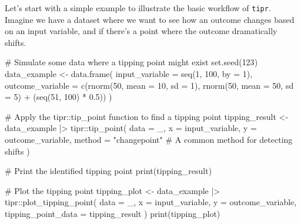\documentclass[
  10pt,
  letterpaper,
  DIV=11,
  numbers=noendperiod]{scrartcl}
\newenvironment{Shaded}{\begin{snugshade}}{\end{snugshade}}
\newcommand{\AttributeTok}[1]{\textcolor[rgb]{0.40,0.45,0.13}{#1}}
\newcommand{\CommentTok}[1]{\textcolor[rgb]{0.37,0.37,0.37}{#1}}
\newcommand{\DecValTok}[1]{\textcolor[rgb]{0.68,0.00,0.00}{#1}}
\newcommand{\FloatTok}[1]{\textcolor[rgb]{0.68,0.00,0.00}{#1}}
\newcommand{\FunctionTok}[1]{\textcolor[rgb]{0.28,0.35,0.67}{#1}}
\newcommand{\NormalTok}[1]{\textcolor[rgb]{0.00,0.23,0.31}{#1}}
\newcommand{\OtherTok}[1]{\textcolor[rgb]{0.00,0.23,0.31}{#1}}
\newcommand{\SpecialCharTok}[1]{\textcolor[rgb]{0.37,0.37,0.37}{#1}}
\newcommand{\StringTok}[1]{\textcolor[rgb]{0.13,0.47,0.30}{#1}}
\begin{document}
Let's start with a simple example to illustrate the basic workflow of
\texttt{tipr}. Imagine we have a dataset where we want to see how an
outcome changes based on an input variable, and if there's a point where
the outcome dramatically shifts.

\begin{Shaded}
\begin{Highlighting}[]
\CommentTok{\# Simulate some data where a tipping point might exist}
\FunctionTok{set.seed}\NormalTok{(}\DecValTok{123}\NormalTok{)}
\NormalTok{data\_example }\OtherTok{\textless{}{-}} \FunctionTok{data.frame}\NormalTok{(}
  \AttributeTok{input\_variable =} \FunctionTok{seq}\NormalTok{(}\DecValTok{1}\NormalTok{, }\DecValTok{100}\NormalTok{, }\AttributeTok{by =} \DecValTok{1}\NormalTok{),}
  \AttributeTok{outcome\_variable =} \FunctionTok{c}\NormalTok{(}\FunctionTok{rnorm}\NormalTok{(}\DecValTok{50}\NormalTok{, }\AttributeTok{mean =} \DecValTok{10}\NormalTok{, }\AttributeTok{sd =} \DecValTok{1}\NormalTok{), }\FunctionTok{rnorm}\NormalTok{(}\DecValTok{50}\NormalTok{, }\AttributeTok{mean =} \DecValTok{50}\NormalTok{, }\AttributeTok{sd =} \DecValTok{5}\NormalTok{) }\SpecialCharTok{+}\NormalTok{ (}\FunctionTok{seq}\NormalTok{(}\DecValTok{51}\NormalTok{, }\DecValTok{100}\NormalTok{) }\SpecialCharTok{*} \FloatTok{0.5}\NormalTok{))}
\NormalTok{)}

\CommentTok{\# Apply the tipr::tip\_point function to find a tipping point}
\NormalTok{tipping\_result }\OtherTok{\textless{}{-}}\NormalTok{ data\_example }\SpecialCharTok{|\textgreater{}}
\NormalTok{  tipr}\SpecialCharTok{::}\FunctionTok{tip\_point}\NormalTok{(}
    \AttributeTok{data =}\NormalTok{ \_,}
    \AttributeTok{x =}\NormalTok{ input\_variable,}
    \AttributeTok{y =}\NormalTok{ outcome\_variable,}
    \AttributeTok{method =} \StringTok{"changepoint"} \CommentTok{\# A common method for detecting shifts}
\NormalTok{  )}

\CommentTok{\# Print the identified tipping point}
\FunctionTok{print}\NormalTok{(tipping\_result)}

\CommentTok{\# Plot the tipping point}
\NormalTok{tipping\_plot }\OtherTok{\textless{}{-}}\NormalTok{ data\_example }\SpecialCharTok{|\textgreater{}}
\NormalTok{  tipr}\SpecialCharTok{::}\FunctionTok{plot\_tipping\_point}\NormalTok{(}
    \AttributeTok{data =}\NormalTok{ \_,}
    \AttributeTok{x =}\NormalTok{ input\_variable,}
    \AttributeTok{y =}\NormalTok{ outcome\_variable,}
    \AttributeTok{tipping\_point\_data =}\NormalTok{ tipping\_result}
\NormalTok{  )}
\FunctionTok{print}\NormalTok{(tipping\_plot)}
\end{Highlighting}
\end{Shaded}
\end{document}

